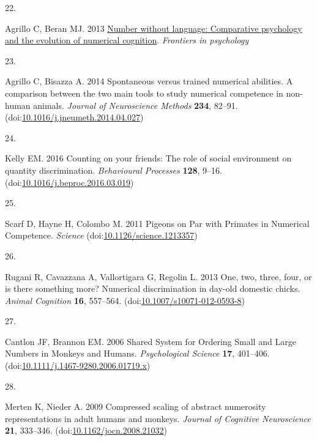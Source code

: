 \documentclass[
  ,doc,floatsintext]{apa6}
\newlength{\cslhangindent}
\newlength{\csllabelwidth}
\newlength{\cslentryspacingunit} %
\newenvironment{CSLReferences}[2] %
 {%
  \setlength{\parindent}{0pt}
  \ifodd #1
  \let\oldpar\par
  \def\par{\hangindent=\cslhangindent\oldpar}
  \fi
  \setlength{\parskip}{#2\cslentryspacingunit}
 }%
 {}
\newcommand{\CSLLeftMargin}[1]{\parbox[t]{\csllabelwidth}{#1}}
\newcommand{\CSLRightInline}[1]{\parbox[t]{\linewidth - \csllabelwidth}{#1}\break}
\begin{document}
\begin{CSLReferences}{0}{0}
\leavevmode{}%
\CSLLeftMargin{22. }
\CSLRightInline{Agrillo C, Beran MJ. 2013 \href{https://www.academia.edu/6879466/Number_without_language_comparative_psychology_and_the_evolution_of_numerical_cognition}{Number without language: Comparative psychology and the evolution of numerical cognition}. \emph{Frontiers in psychology} }

\leavevmode{}%
\CSLLeftMargin{23. }
\CSLRightInline{Agrillo C, Bisazza A. 2014 Spontaneous versus trained numerical abilities. {A} comparison between the two main tools to study numerical competence in non-human animals. \emph{Journal of Neuroscience Methods} \textbf{234}, 82--91. (doi:\href{https://doi.org/10.1016/j.jneumeth.2014.04.027}{10.1016/j.jneumeth.2014.04.027})}

\leavevmode{}%
\CSLLeftMargin{24. }
\CSLRightInline{Kelly EM. 2016 Counting on your friends: {The} role of social environment on quantity discrimination. \emph{Behavioural Processes} \textbf{128}, 9--16. (doi:\href{https://doi.org/10.1016/j.beproc.2016.03.019}{10.1016/j.beproc.2016.03.019})}

\leavevmode{}%
\CSLLeftMargin{25. }
\CSLRightInline{Scarf D, Hayne H, Colombo M. 2011 Pigeons on {Par} with {Primates} in {Numerical} {Competence}. \emph{Science} (doi:\href{https://doi.org/10.1126/science.1213357}{10.1126/science.1213357})}

\leavevmode{}%
\CSLLeftMargin{26. }
\CSLRightInline{Rugani R, Cavazzana A, Vallortigara G, Regolin L. 2013 One, two, three, four, or is there something more? {Numerical} discrimination in day-old domestic chicks. \emph{Animal Cognition} \textbf{16}, 557--564. (doi:\href{https://doi.org/10.1007/s10071-012-0593-8}{10.1007/s10071-012-0593-8})}

\leavevmode{}%
\CSLLeftMargin{27. }
\CSLRightInline{Cantlon JF, Brannon EM. 2006 Shared {System} for {Ordering} {Small} and {Large} {Numbers} in {Monkeys} and {Humans}. \emph{Psychological Science} \textbf{17}, 401--406. (doi:\href{https://doi.org/10.1111/j.1467-9280.2006.01719.x}{10.1111/j.1467-9280.2006.01719.x})}

\leavevmode{}%
\CSLLeftMargin{28. }
\CSLRightInline{Merten K, Nieder A. 2009 Compressed scaling of abstract numerosity representations in adult humans and monkeys. \emph{Journal of Cognitive Neuroscience} \textbf{21}, 333--346. (doi:\href{https://doi.org/10.1162/jocn.2008.21032}{10.1162/jocn.2008.21032})}


\end{CSLReferences}
\end{document}
